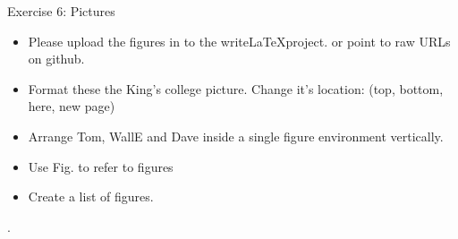 \documentclass[10pt,times]{beamer}
\begin{document}
\begin{frame}[fragile]{Exercise 6: Pictures}

\begin{center}
\end{center}

\begin{itemize}
\item Please upload the figures in  to the write\LaTeX project. or 
point to raw URLs on github.
\item Format these the King's college picture. Change it's location: (top, 
bottom, here, new page)
\item Arrange Tom, WallE and Dave inside a single figure environment 
vertically.
\item Use Fig. to refer to figures
\item Create a list of figures.
\end{itemize}

\begin{center}
%
.
\end{center}

\end{frame}


\end{document}
